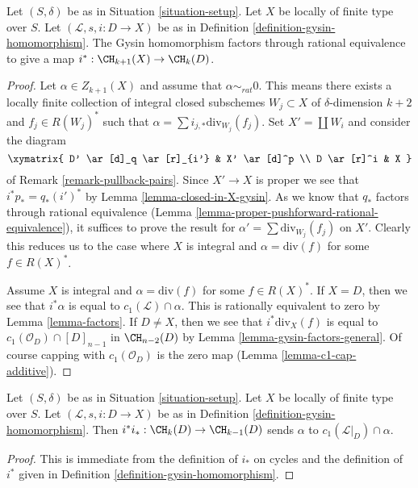 \begin{lemma}
\label{lemma-gysin-factors}
Let $(S, \delta)$ be as in Situation \ref{situation-setup}.
Let $X$ be locally of finite type over $S$.
Let $(\mathcal{L}, s, i : D \to X)$ be as in
Definition \ref{definition-gysin-homomorphism}.
The Gysin homomorphism factors through rational equivalence to
give a map $i^* : \CH_{k + 1}(X) \to \CH_k(D)$.
\end{lemma}

\begin{proof}
Let $\alpha \in Z_{k + 1}(X)$ and assume that $\alpha \sim_{rat} 0$.
This means there exists a locally finite collection of integral
closed subschemes $W_j \subset X$ of $\delta$-dimension $k + 2$
and $f_j \in R(W_j)^*$ such that
$\alpha = \sum i_{j, *}\text{div}_{W_j}(f_j)$.
Set $X' = \coprod W_i$ and consider the diagram
$$
\xymatrix{
D' \ar[d]_q \ar[r]_{i'} & X' \ar[d]^p \\
D \ar[r]^i & X
}
$$
of Remark \ref{remark-pullback-pairs}. Since $X' \to X$ is proper
we see that $i^*p_* = q_*(i')^*$ by Lemma \ref{lemma-closed-in-X-gysin}.
As we know that $q_*$ factors through rational equivalence
(Lemma \ref{lemma-proper-pushforward-rational-equivalence}), it suffices
to prove the result for $\alpha' = \sum \text{div}_{W_j}(f_j)$
on $X'$. Clearly this reduces us to the case where $X$ is integral
and $\alpha = \text{div}(f)$ for some $f \in R(X)^*$.

\medskip\noindent
Assume $X$ is integral and $\alpha = \text{div}(f)$ for some $f \in R(X)^*$.
If $X = D$, then we see that $i^*\alpha$ is equal
to $c_1(\mathcal{L}) \cap \alpha$.
This is rationally equivalent to zero by Lemma \ref{lemma-factors}.
If $D \not = X$, then we see that $i^*\text{div}_X(f)$ is equal to
$c_1(\mathcal{O}_D) \cap [D]_{n - 1}$ in $\CH_{n - 2}(D)$ by
Lemma \ref{lemma-gysin-factors-general}. Of course
capping with $c_1(\mathcal{O}_D)$ is the zero map
(Lemma \ref{lemma-c1-cap-additive}).
\end{proof}

\begin{lemma}
\label{lemma-gysin-back}
Let $(S, \delta)$ be as in Situation \ref{situation-setup}. Let $X$ be locally
of finite type over $S$. Let $(\mathcal{L}, s, i : D \to X)$ be as in
Definition \ref{definition-gysin-homomorphism}. Then
$i^*i_* : \CH_k(D) \to \CH_{k - 1}(D)$ sends $\alpha$ to
$c_1(\mathcal{L}|_D) \cap \alpha$.
\end{lemma}

\begin{proof}
This is immediate from the definition of $i_*$ on cycles
and the definition of $i^*$ given in
Definition \ref{definition-gysin-homomorphism}.
\end{proof}


